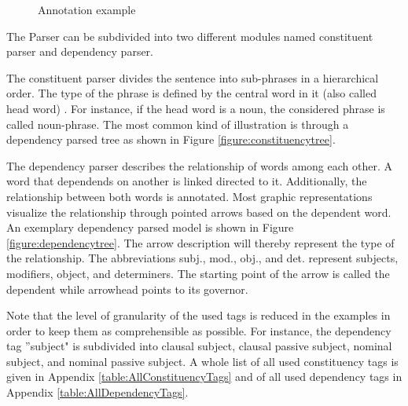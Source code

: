 \begin{figure}[h]
	\centering
	\caption{Annotation example}
	\label{figure:nlppipelineexample}
\end{figure}

The Parser can be subdivided into two different modules named constituent parser and dependency parser. 

The constituent parser divides the sentence into sub-phrases in a hierarchical order. The type of the phrase is defined by the central word in it (also called head word) \citep{jurafsky2014speech}. For instance, if the head word is a noun, the considered phrase is called noun-phrase. The most common kind of illustration is through a dependency parsed tree as shown in Figure \ref{figure:constituencytree}.

The dependency parser describes the relationship of words among each other. A word that dependends on another is linked directed to it. Additionally, the relationship between both words is annotated. Most graphic representations visualize the relationship through pointed arrows based on the dependent word. An exemplary dependency parsed model is shown in Figure \ref{figure:dependencytree}. The arrow description will thereby represent the type of the relationship. The abbreviations subj., mod., obj., and det. represent subjects, modifiers, object, and determiners. The starting point of the arrow is called the dependent while arrowhead points to its governor.

Note that the level of granularity of the used tags is reduced in the examples in order to keep them as comprehensible as possible. For instance, the dependency tag ''subject" is subdivided into clausal subject, clausal passive subject, nominal subject, and nominal passive subject. A whole list of all used constituency tags is given in Appendix \ref{table:AllConstituencyTags} and of all used dependency tags in Appendix \ref{table:AllDependencyTags}.

